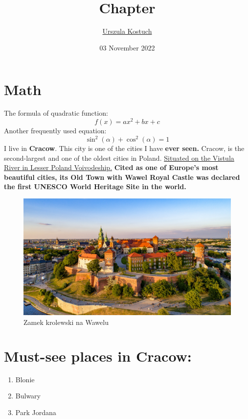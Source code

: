 \documentclass{article}
\title{\textbf{Chapter}}
\author
{\underline{Urszula Kostuch}}
\date{03 November 2022}
\begin{document}
\maketitle

\section{Math}
The formula of quadratic function:
\[f(x)=ax^2+bx+c\]
Another frequently used equation:
\[\sin^2(\alpha) +\cos^2(\alpha) =1\]
I live in {\textbf{Cracow}}. This city is one of the  cities I have \textbf{ever seen.} Cracow, is the second-largest and one of the oldest cities in Poland. \underline{Situated on the Vistula River in Lesser Poland Voivodeship.}  \textbf{Cited as one of Europe's most beautiful cities, its Old Town with Wawel Royal Castle was declared the first UNESCO World Heritage Site in the world.}

\begin{figure}[h!]
\includegraphics[width=\linewidth]{Pictures/wawel.jpg}
\caption{Zamek krolewski na Wawelu}
  \label{fig:wawel}
\end{figure}
\pagebreak
\section{Must-see places in Cracow:}
\centering
{}
\begin{enumerate}
  \item Blonie
  \item Bulwary
  \item Park Jordana
\end{enumerate}
\end{document}
